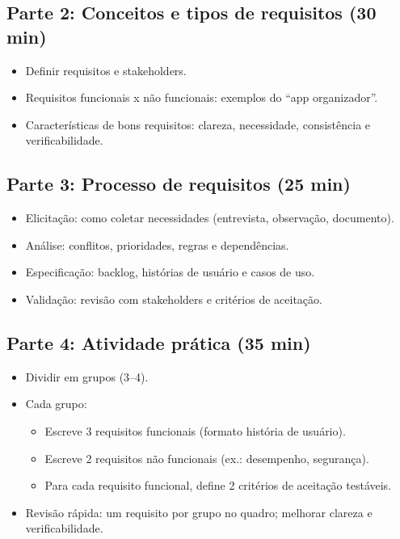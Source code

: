 \documentclass[12pt,a4paper]{article}
\begin{document}
\subsection*{Parte 2: Conceitos e tipos de requisitos (30 min)}
\begin{itemize}[leftmargin=*,itemsep=0.35em]
  \item Definir requisitos e stakeholders.
  \item Requisitos funcionais x não funcionais: exemplos do ``app organizador''.
  \item Características de bons requisitos: clareza, necessidade, consistência e verificabilidade.
\end{itemize}

\subsection*{Parte 3: Processo de requisitos (25 min)}
\begin{itemize}[leftmargin=*,itemsep=0.35em]
  \item Elicitação: como coletar necessidades (entrevista, observação, documento).
  \item Análise: conflitos, prioridades, regras e dependências.
  \item Especificação: backlog, histórias de usuário e casos de uso.
  \item Validação: revisão com stakeholders e critérios de aceitação.
\end{itemize}

\subsection*{Parte 4: Atividade prática (35 min)}
\begin{itemize}[leftmargin=*,itemsep=0.35em]
  \item Dividir em grupos (3--4).
  \item Cada grupo:
  \begin{itemize}[leftmargin=*,itemsep=0.25em]
    \item Escreve 3 requisitos funcionais (formato história de usuário).
    \item Escreve 2 requisitos não funcionais (ex.: desempenho, segurança).
    \item Para cada requisito funcional, define 2 critérios de aceitação testáveis.
  \end{itemize}
  \item Revisão rápida: um requisito por grupo no quadro; melhorar clareza e verificabilidade.
\end{itemize}
\end{document}
